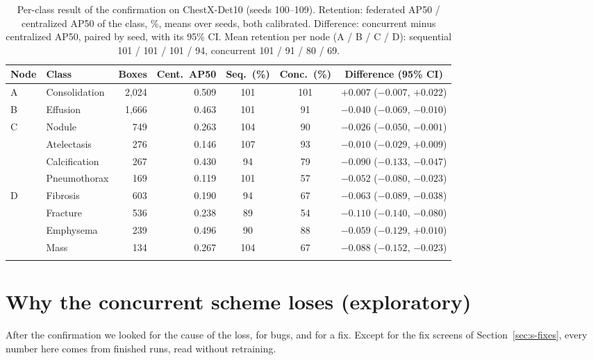 \documentclass[pdflatex,sn-mathphys-num]{sn-jnl}
\begin{document}
\begin{table}[h]
\caption{Per-class result of the confirmation on ChestX-Det10 (seeds 100--109). Retention: federated AP50 / centralized AP50 of the class, \%, means over seeds, both calibrated. Difference: concurrent minus centralized AP50, paired by seed, with its 95\% CI. Mean retention per node (A / B / C / D): sequential 101 / 101 / 101 / 94, concurrent 101 / 91 / 80 / 69.}\label{tab:s-classes}
\footnotesize
\setlength{\tabcolsep}{3pt}
\begin{tabular*}{\textwidth}{@{\extracolsep\fill}llrrccc}
\toprule
Node & Class & Boxes & Cent.\ AP50 & Seq.\ (\%) & Conc.\ (\%) & Difference (95\% CI) \\
\midrule
A & Consolidation & 2,024 & 0.509 & 101 & 101 & $+0.007$ ($-0.007$, $+0.022$) \\
B & Effusion & 1,666 & 0.463 & 101 & 91 & $-0.040$ ($-0.069$, $-0.010$) \\
C & Nodule & 749 & 0.263 & 104 & 90 & $-0.026$ ($-0.050$, $-0.001$) \\
 & Atelectasis & 276 & 0.146 & 107 & 93 & $-0.010$ ($-0.029$, $+0.009$) \\
 & Calcification & 267 & 0.430 & 94 & 79 & $-0.090$ ($-0.133$, $-0.047$) \\
 & Pneumothorax & 169 & 0.119 & 101 & 57 & $-0.052$ ($-0.080$, $-0.023$) \\
D & Fibrosis & 603 & 0.190 & 94 & 67 & $-0.063$ ($-0.089$, $-0.038$) \\
 & Fracture & 536 & 0.238 & 89 & 54 & $-0.110$ ($-0.140$, $-0.080$) \\
 & Emphysema & 239 & 0.496 & 90 & 88 & $-0.059$ ($-0.129$, $+0.010$) \\
 & Mass & 134 & 0.267 & 104 & 67 & $-0.088$ ($-0.152$, $-0.023$) \\
\botrule
\end{tabular*}
\end{table}

\section{Why the concurrent scheme loses (exploratory)}\label{sec:s-cause}

After the confirmation we looked for the cause of the loss, for bugs, and for a fix. Except for the fix screens of Section~\ref{sec:s-fixes}, every number here comes from finished runs, read without retraining.
\end{document}
